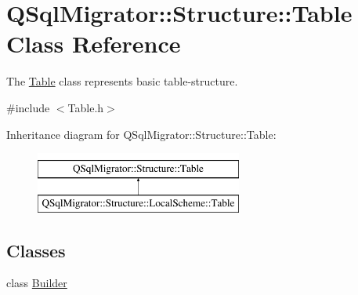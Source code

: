 \hypertarget{class_q_sql_migrator_1_1_structure_1_1_table}{}\section{Q\+Sql\+Migrator\+:\+:Structure\+:\+:Table Class Reference}
\label{class_q_sql_migrator_1_1_structure_1_1_table}


The \hyperlink{class_q_sql_migrator_1_1_structure_1_1_table}{Table} class represents basic table-\/structure.  




{\ttfamily \#include $<$Table.\+h$>$}

Inheritance diagram for Q\+Sql\+Migrator\+:\+:Structure\+:\+:Table\+:\begin{figure}[H]
\begin{center}
\leavevmode
\includegraphics[height=2.000000cm]{class_q_sql_migrator_1_1_structure_1_1_table}
\end{center}
\end{figure}
\subsection*{Classes}
\begin{DoxyCompactItemize}
\item 
class \hyperlink{class_q_sql_migrator_1_1_structure_1_1_table_1_1_builder}{Builder}
\end{DoxyCompactItemize}
